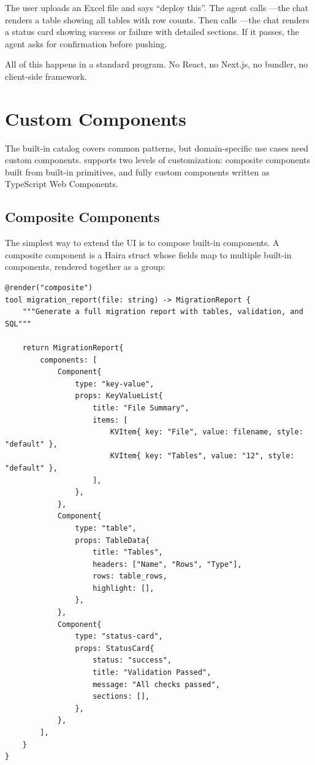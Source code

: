 The user uploads an Excel file and says ``deploy this''. The agent calls ---the chat renders a table showing all tables with row counts. Then calls ---the chat renders a status card showing success or failure with detailed sections. If it passes, the agent asks for confirmation before pushing.

All of this happens in a standard \haira{} program. No React, no Next.js, no bundler, no client-side framework.

\section{Custom Components}

The built-in catalog covers common patterns, but domain-specific use cases need custom components. \haira{} supports two levels of customization: composite components built from built-in primitives, and fully custom components written as TypeScript Web Components.

\subsection{Composite Components}

The simplest way to extend the UI is to compose built-in components. A composite component is a Haira struct whose fields map to multiple built-in components, rendered together as a group:

\begin{lstlisting}
@render("composite")
tool migration_report(file: string) -> MigrationReport {
    """Generate a full migration report with tables, validation, and SQL"""

    return MigrationReport{
        components: [
            Component{
                type: "key-value",
                props: KeyValueList{
                    title: "File Summary",
                    items: [
                        KVItem{ key: "File", value: filename, style: "default" },
                        KVItem{ key: "Tables", value: "12", style: "default" },
                    ],
                },
            },
            Component{
                type: "table",
                props: TableData{
                    title: "Tables",
                    headers: ["Name", "Rows", "Type"],
                    rows: table_rows,
                    highlight: [],
                },
            },
            Component{
                type: "status-card",
                props: StatusCard{
                    status: "success",
                    title: "Validation Passed",
                    message: "All checks passed",
                    sections: [],
                },
            },
        ],
    }
}
\end{lstlisting}

